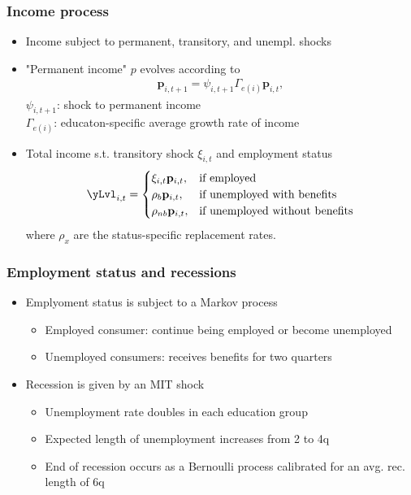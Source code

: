 \documentclass[pdflatex,aspectratio=169]{beamer}
\begin{document}
\begin{frame}
\frametitle{ Income process}

	\begin{itemize}
		\itemsep = .5\bigskipamount 
		\item Income subject to permanent, transitory, and unempl. shocks
		\item "Permanent income" $p$ evolves according to
		\begin{align}
		\mathbf{p}_{i,t+1} = \psi_{i,t+1}\Gamma_{e(i)}\mathbf{p}_{i,t},
		\end{align}
	 	$\psi_{i,t+1}$: shock to permanent income \\[.7ex]
	 	$\Gamma_{e(i)}$: educaton-specific average growth rate of income 
		\item Total income s.t. transitory shock $\xi_{i,t}$ and  employment status
		\begin{align}
		\yLvl_{i,t} =   \begin{cases}
		\xi_{i,t}\mathbf{p}_{i,t}, & \text{if employed} \\
		\rho_b \mathbf{p}_{i,t}, & \text{if unemployed with benefits} \\
		\rho_{nb} \mathbf{p}_{i,t}, & \text{if unemployed without benefits} 
		\end{cases}
		\end{align}
		where $\rho_x$ are the status-specific replacement rates.
	\end{itemize}

\end{frame}


\begin{frame}
\frametitle{ Employment status and recessions}
\begin{itemize}
	\itemsep = \bigskipamount 
	\item Emplyoment status is subject to a Markov process
	\begin{itemize}
		\itemsep = .5\bigskipamount
		\item Employed consumer: continue being employed or become unemployed 
		\item Unemployed consumers: receives benefits for two quarters
	\end{itemize}

	\item Recession is given by an MIT shock
	\begin{itemize}
		\itemsep = .5\bigskipamount
		\item Unemployment rate doubles in each education group
		\item Expected length of unemployment increases from 2 to 4q
		\item End of recession occurs as a Bernoulli process calibrated for an avg. rec. length of 6q
	\end{itemize}
\end{itemize}
\end{frame}
\end{document}
